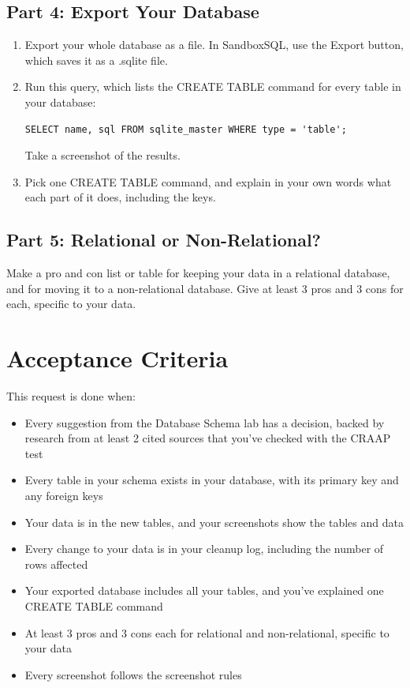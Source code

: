 \documentclass[12pt]{article}
\begin{document}
\subsection*{Part 4: Export Your Database}
\begin{enumerate}
    \item Export your whole database as a file. In SandboxSQL, use the Export button, which saves it as a .sqlite file.
    \item Run this query, which lists the CREATE TABLE command for every table in your database:
\begin{Verbatim}
SELECT name, sql FROM sqlite_master WHERE type = 'table';
\end{Verbatim}
    Take a screenshot of the results.
    \item Pick one CREATE TABLE command, and explain in your own words what each part of it does, including the keys.
\end{enumerate}

\subsection*{Part 5: Relational or Non-Relational?}
Make a pro and con list or table for keeping your data in a relational database, and for moving it to a non-relational database. Give at least 3 pros and 3 cons for each, specific to your data.

\section*{Acceptance Criteria}
This request is done when:
\begin{itemize}
    \item Every suggestion from the Database Schema lab has a decision, backed by research from at least 2 cited sources that you've checked with the CRAAP test
    \item Every table in your schema exists in your database, with its primary key and any foreign keys
    \item Your data is in the new tables, and your screenshots show the tables and data
    \item Every change to your data is in your cleanup log, including the number of rows affected
    \item Your exported database includes all your tables, and you've explained one CREATE TABLE command
    \item At least 3 pros and 3 cons each for relational and non-relational, specific to your data
    \item Every screenshot follows the screenshot rules
\end{itemize}
\end{document}
